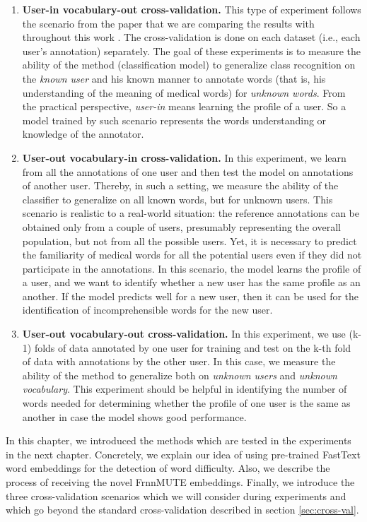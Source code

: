 \begin{enumerate}
    \item \textbf{User-in vocabulary-out cross-validation.} This type of experiment follows the scenario from the paper that we are comparing the results with throughout this work \citep{Grabar-PITR2014}.  The cross-validation is done on each dataset (i.e., each user's annotation) separately. The goal of these experiments is to measure the ability of the method (classification model) to generalize class recognition on the \textit{known user} and his known manner to annotate words (that is, his understanding of the meaning of medical words) for \textit{unknown words}.  From the practical perspective, \textit{user-in} means learning the profile of a user. So a model trained by such scenario represents the words understanding or knowledge of the annotator.
      
    \item \textbf{User-out vocabulary-in cross-validation.} In this experiment, we learn from all the annotations of one user and then test the model on annotations of another user. Thereby, in such a setting, we measure the ability of the classifier to generalize on all known words, but for unknown users. This scenario is realistic to a real-world situation: the reference annotations can be obtained only from a couple of users, presumably representing the overall population, but not from all the possible users. Yet, it is necessary to predict the familiarity of medical words for all the potential users even if they did not participate in the annotations. In this scenario, the model learns the profile of a user, and we want to identify whether a new user has the same profile as an another. If the model predicts well for a new user, then it can be used for the identification of incomprehensible words for the new user. 
      
    \item \textbf{User-out vocabulary-out cross-validation.} In this experiment, we use (k-1) folds of data annotated by one user for training and test on the k-th fold of data with annotations by the other user. In this case, we measure the ability of the method to generalize both on \textit{unknown users} and \textit{ unknown vocabulary}. This experiment should be helpful in identifying the number of words needed for determining whether the profile of one user is the same as another in case the model shows good performance.
\end{enumerate}

\bigskip
In this chapter, we introduced the methods which are tested in the experiments in the next chapter. Concretely, we explain our idea of using pre-trained FastText word embeddings for the detection of word difficulty. Also, we describe the process of receiving the novel FrnnMUTE embeddings. Finally, we introduce the three cross-validation scenarios which we will consider during experiments and which go beyond the standard cross-validation described in section \ref{sec:cross-val}. 